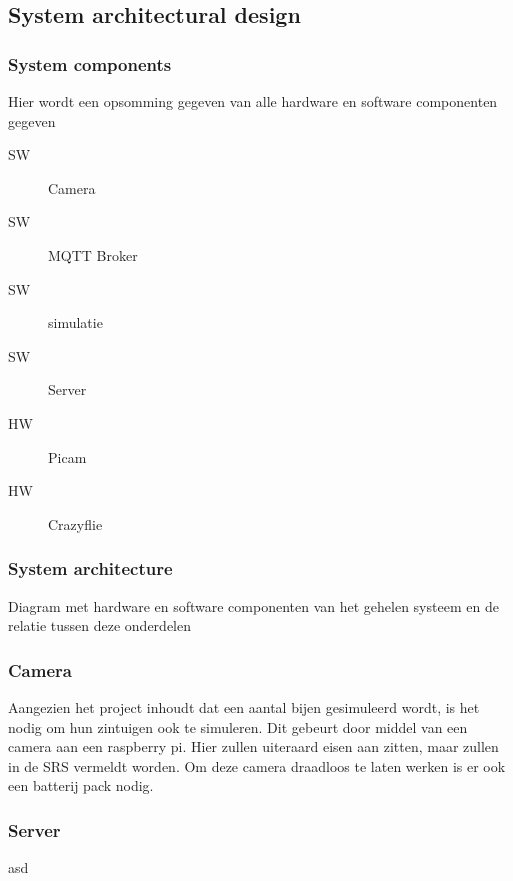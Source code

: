 \subsection{System architectural design}

\subsubsection{System components}
Hier wordt een opsomming gegeven van alle hardware en software componenten gegeven

\begin{description}
    \item[SW] Camera
    \item[SW] MQTT Broker
    \item[SW] simulatie
    \item[SW] Server
    \item[HW] Picam
    \item[HW] Crazyflie   
\end{description}

\subsubsection{System architecture}
Diagram met hardware en software componenten van het gehelen systeem en de relatie tussen deze onderdelen
\subsubsection*{Camera}
Aangezien het project inhoudt dat een aantal bijen gesimuleerd wordt, is het nodig om hun zintuigen ook te simuleren. Dit gebeurt door middel van een camera aan een raspberry pi. Hier zullen uiteraard eisen aan zitten, maar zullen in de SRS vermeldt worden. Om deze camera draadloos te laten werken is er ook een batterij pack nodig.

\subsubsection*{Server}
asd
\newline

